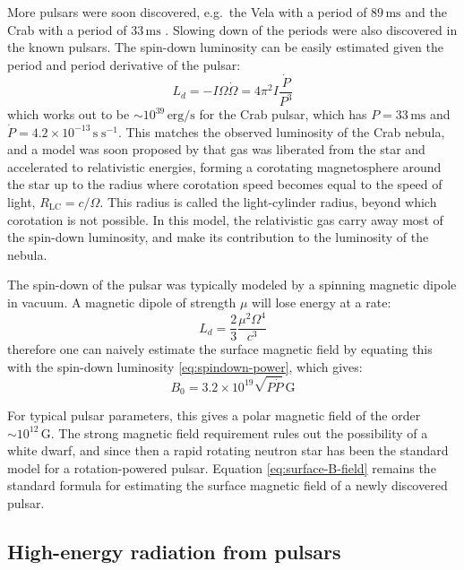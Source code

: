 More pulsars were soon discovered, e.g.\ the Vela with a period of
$89\,\mathrm{ms}$ \citep{large_pulsar_1968} and the Crab with a period of
$33\,\mathrm{ms}$ \citep{lovelace_pulsar_1968}. Slowing down of the periods were
also discovered in the known pulsars. The spin-down luminosity can be easily
estimated given the period and period derivative of the pulsar:
\begin{equation}
  \label{eq:spindown-power}
  L_{d} = -I\Omega\dot{\Omega} = 4\pi^2 I\frac{\dot{P}}{P^3}
\end{equation}
which works out to be $\sim 10^{39}\,\mathrm{erg/s}$ for the Crab pulsar, which
has $P = 33\,\mathrm{ms}$ and $\dot{P} = 4.2\times
10^{-13}\,\mathrm{s\;s^{-1}}$. This matches the observed luminosity of the Crab
nebula, and a model was soon proposed by \citet{gold_rotating_1969} that gas was
liberated from the star and accelerated to relativistic energies, forming a
corotating magnetosphere around the star up to the radius where corotation speed
becomes equal to the speed of light, $R_\mathrm{LC} = c/\Omega$. This radius is
called the light-cylinder radius, beyond which corotation is not possible. In
this model, the relativistic gas carry away most of the spin-down luminosity,
and make its contribution to the luminosity of the nebula.

The spin-down of the pulsar was typically modeled by a spinning magnetic dipole
in vacuum. A magnetic dipole of strength $\mu$ will lose energy at a rate:
\begin{equation}
  \label{eq:dipole-spin-down}
  L_{d} = \frac{2}{3}\frac{\mu^2\Omega^4}{c^3}
\end{equation}
therefore one can naively estimate the surface magnetic field by equating this
with the spin-down luminosity \eqref{eq:spindown-power}, which gives:
\begin{equation}
  \label{eq:surface-B-field}
  B_0 = 3.2\times 10^{19}\sqrt{P \dot{P}}\,\mathrm{G}
\end{equation}

For typical pulsar parameters, this gives a polar magnetic field of the order
$\sim 10^{12}\,\mathrm{G}$. The strong magnetic field requirement rules out the
possibility of a white dwarf, and since then a rapid rotating neutron star has
been the standard model for a rotation-powered pulsar. Equation
\eqref{eq:surface-B-field} remains the standard formula for estimating the surface
magnetic field of a newly discovered pulsar.

\subsection{High-energy radiation from pulsars}
\label{sec:observ-high-energy}

